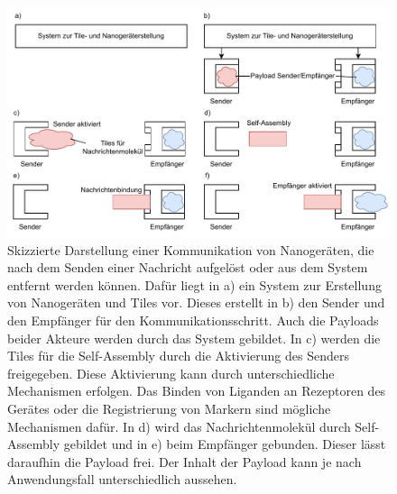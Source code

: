 \begin{figure}
    \centering
    \includegraphics[width=\textwidth]{images/One-Way Communication.pdf}
    \caption[Einweg Kommunikation]{Skizzierte Darstellung einer Kommunikation von Nanogeräten, die nach dem Senden einer Nachricht aufgelöst oder aus dem System entfernt werden können. Dafür liegt in a) ein System zur Erstellung von Nanogeräten und Tiles vor. Dieses erstellt in b) den Sender und den Empfänger für den Kommunikationsschritt. Auch die Payloads beider Akteure werden durch das System gebildet. In c) werden die Tiles für die Self-Assembly durch die Aktivierung des Senders freigegeben. Diese Aktivierung kann durch unterschiedliche Mechanismen erfolgen. Das Binden von Liganden an Rezeptoren des Gerätes oder die Registrierung von Markern sind mögliche Mechanismen dafür. In d) wird das Nachrichtenmolekül durch Self-Assembly gebildet und in e) beim Empfänger gebunden. Dieser lässt daraufhin die Payload frei. Der Inhalt der Payload kann je nach Anwendungsfall unterschiedlich aussehen.}
    \label{fig:onewaycomm}
\end{figure}

